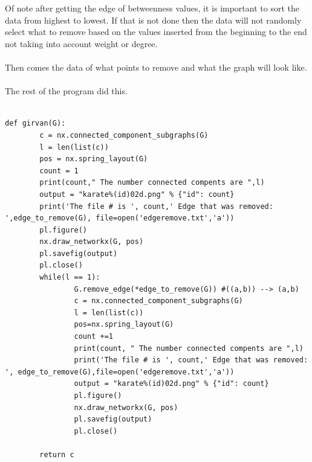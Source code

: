\documentclass[10pt,letterpaper]{article}
\begin{document}
Of note after getting the edge of betweenness values, it is important to sort the data from highest to lowest.  If that is not done then the data will not randomly select what to remove based on the values inserted from the beginning to the end not  taking into account weight or degree.\\
\\
Then comes the data of what points to remove and what the graph will look like.\\
\\
The rest of the program did this.\\
\\
\begin{lstlisting}
def girvan(G):
        c = nx.connected_component_subgraphs(G)
        l = len(list(c))
        pos = nx.spring_layout(G)
        count = 1
        print(count," The number connected compents are ",l)
        output = "karate%(id)02d.png" % {"id": count}
        print('The file # is ', count,' Edge that was removed: ',edge_to_remove(G), file=open('edgeremove.txt','a'))
        pl.figure()
        nx.draw_networkx(G, pos)
        pl.savefig(output)
        pl.close()
        while(l == 1):
                G.remove_edge(*edge_to_remove(G)) #((a,b)) --> (a,b)
                c = nx.connected_component_subgraphs(G)
                l = len(list(c))
                pos=nx.spring_layout(G)
                count +=1
                print(count, " The number connected compents are ",l)
                print('The file # is ', count,' Edge that was removed: ', edge_to_remove(G),file=open('edgeremove.txt','a'))
                output = "karate%(id)02d.png" % {"id": count}
                pl.figure()
                nx.draw_networkx(G, pos)
                pl.savefig(output)
                pl.close()

        return c
\end{lstlisting}
\end{document}
